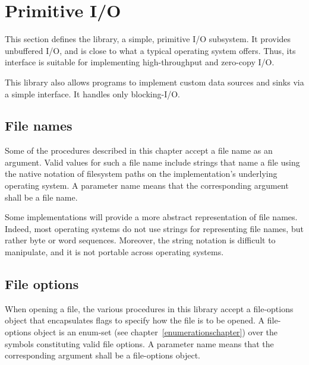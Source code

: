 \section{Primitive I/O}
\label{primiosection}

This section defines the  library, a
simple, primitive I/O subsystem.  It provides unbuffered I/O, and is
close to what a typical operating system offers. Thus, its interface
is suitable for implementing high-throughput and zero-copy I/O.

This library also allows programs to implement custom data
sources and sinks via a simple interface.
It handles only blocking-I/O.

\subsection{File names}

Some of the procedures described in this chapter accept a file name as an
argument. Valid values for such a file name include strings that name a file
using the native notation of filesystem paths on the implementation's underlying
operating system.
A  parameter name means that the
corresponding argument shall be a file name.

Some implementations will provide a more
abstract representation of file names. Indeed, most operating
systems do not use strings for representing file names, but rather byte
or word sequences. Moreover, the string notation is difficult to manipulate, and
it is not portable across operating systems.

\subsection{File options}
\label{fileoptionssection}

When opening a file, the various procedures in this library accept a
{\cf file-options} object that encapsulates flags to specify how
the file is to be opened. A {\cf file-options} object is an enum-set
(see chapter~\ref{enumerationschapter}) over the symbols constituting
valid file options.
A  parameter name means that the
corresponding argument shall be a file-options object.

